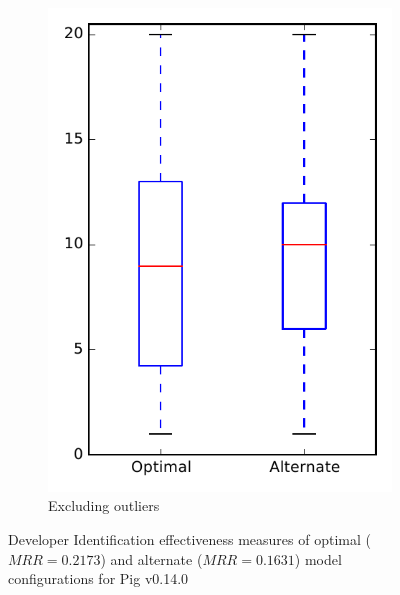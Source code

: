 \begin{figure}
\begin{subfigure}{.4\textwidth}
        \includegraphics[height=0.4\textheight]{figures/combo/dit_rq1_pig_no_outlier}
        \caption{Excluding outliers}\label{fig:combo:dit:rq1:pig_no_outlier}
    \end{subfigure}
\caption[Developer Identification effectiveness measures of optimal and alternate model configurations for Pig v0.14.0]%
{Developer Identification effectiveness measures of optimal ($MRR=0.2173$) and alternate ($MRR=0.1631$) model configurations for Pig v0.14.0}
\label{fig:combo:dit:rq1:pig}
\end{figure}
